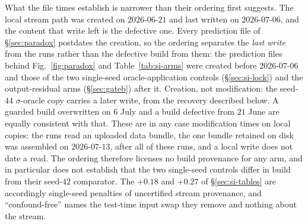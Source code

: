 What the file times establish is narrower than their ordering first suggests. The local stream path
was created on $2026$-$06$-$21$ and last written on $2026$-$07$-$06$, and the content that write
left is the defective one. Every prediction file of \S\ref{sec:paradox} postdates the creation, so
the ordering separates the \emph{last write} from the runs rather than the defective build from
them: the prediction files behind Fig.~\ref{fig:paradox} and Table~\ref{tab:si-arms} were created
before $2026$-$07$-$06$ and those of the two single-seed oracle-application controls
(\S\ref{sec:si-lock}) and the output-residual arms (\S\ref{sec:gateb}) after it. Creation, not
modification: the seed-$44$ $\sigma$-oracle copy carries a later write, from the recovery described
below. A guarded build overwritten on $6$ July and
a build defective from $21$ June are equally consistent with that. These are in any case
modification times on local copies: the runs read an uploaded data bundle, the one bundle retained
on disk was assembled on $2026$-$07$-$13$, after all of these runs, and a local write does not date
a read. The ordering therefore licenses no build provenance for any arm, and in particular does not
establish that the two single-seed controls differ in build from their seed-$42$ comparator. The
$+0.18$ and $+0.27$ of \S\ref{sec:si-tables} are accordingly single-seed penalties of uncertified
stream provenance, and ``confound-free'' names the test-time input swap they remove and nothing
about the stream.

